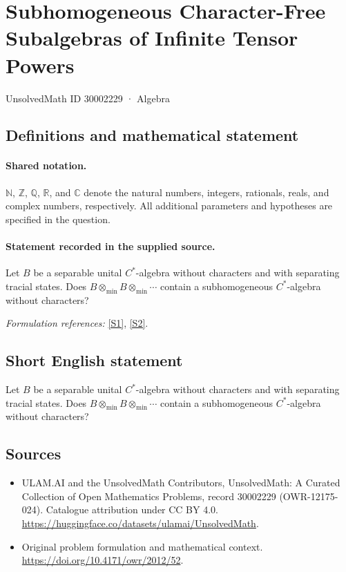 \documentclass[11pt]{article}
\newcommand{\sref}[2]{\hyperlink{source:#1:#2}{[S#2]}}
\begin{document}
\setcounter{section}{30002228}
\section{Subhomogeneous Character-Free Subalgebras of Infinite Tensor Powers}\label{30002229}
{\small UnsolvedMath ID 30002229 · Algebra}
\subsection{Definitions and mathematical statement}

\paragraph{Shared notation.}$\mathbb N$, $\mathbb Z$, $\mathbb Q$, $\mathbb R$, and $\mathbb C$ denote the natural numbers, integers, rationals, reals, and complex numbers, respectively. All additional parameters and hypotheses are specified in the question.


\paragraph{Statement recorded in the supplied source.}
Let $B$ be a separable unital $C^*$-algebra without characters and with separating tracial states. Does $B\otimes_{\min}B\otimes_{\min}\cdots$ contain a subhomogeneous $C^*$-algebra without characters?
\par\smallskip\textit{Formulation references:} \sref{30002229}{1}, \sref{30002229}{2}.
\subsection{Short English statement}
Let $B$ be a separable unital $C^*$-algebra without characters and with separating tracial states. Does $B\otimes_{\min}B\otimes_{\min}\cdots$ contain a subhomogeneous $C^*$-algebra without characters?
\subsection{Sources}
\begin{itemize}
\item[\hypertarget{source:30002229:1}{S1}] ULAM.AI and the UnsolvedMath Contributors, UnsolvedMath: A Curated Collection of Open Mathematics Problems, record 30002229 (OWR-12175-024). Catalogue attribution under CC BY 4.0.
\url{https://huggingface.co/datasets/ulamai/UnsolvedMath}.
\item[\hypertarget{source:30002229:2}{S2}] Original problem formulation and mathematical context.
\url{https://doi.org/10.4171/owr/2012/52}.
\end{itemize}
\label{end:30002229}
\end{document}
